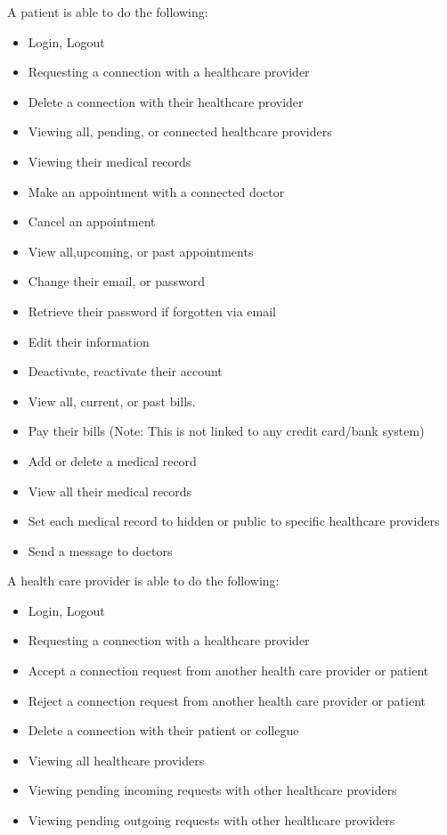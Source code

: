 \documentclass[12pt]{report}
\begin{document}
\begin{itemize}
A patient is able to do the following:
\begin{itemize}
\item Login, Logout
\item Requesting a connection with a healthcare provider
\item Delete a connection with their healthcare provider
\item Viewing all, pending, or connected healthcare providers
\item Viewing their medical records
\item Make an appointment with a connected doctor
\item Cancel an appointment 
\item View all,upcoming, or past appointments
\item Change their email, or password
\item Retrieve their password if forgotten via email
\item Edit their information
\item Deactivate, reactivate their account
\item View all, current, or past bills.
\item Pay their bills (Note: This is not linked to any credit card/bank system) 
\item Add or delete a medical record
\item View all their medical records
\item Set each medical record to hidden or public to specific healthcare providers
\item Send a message to doctors
\end{itemize}
A health care provider is able to do the following:
\begin{itemize}
\item Login, Logout
\item Requesting a connection with a healthcare provider
\item Accept a connection request from another health care provider or patient
\item Reject a connection request from another health care provider or patient
\item Delete a connection with their patient or collegue
\item Viewing all healthcare providers
\item Viewing pending incoming requests with other healthcare providers
\item Viewing pending outgoing requests with other healthcare providers

\end{itemize}
\end{itemize}
\end{document}
